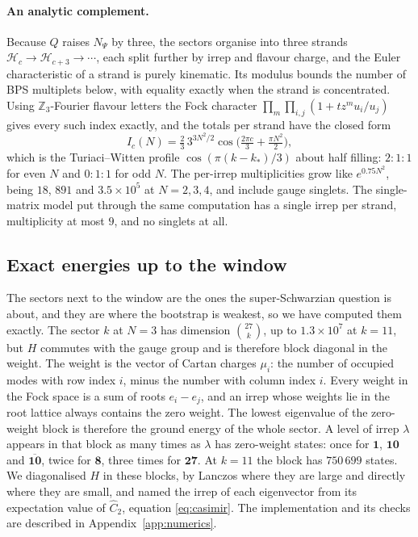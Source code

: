 \documentclass[10pt]{article}
\begin{document}
\paragraph{An analytic complement.} Because $Q$ raises $N_\Psi$ by three, the sectors organise into three
strands $\mathcal H_c\to\mathcal H_{c+3}\to\cdots$, each split further by irrep and flavour charge, and the
Euler characteristic of a strand is purely kinematic. Its modulus bounds the number of BPS multiplets below,
with equality exactly when the strand is concentrated. Using $\mathbb Z_3$-Fourier flavour letters the Fock
character $\prod_m\prod_{i,j}(1+tz^mu_i/u_j)$ gives every such index exactly, and the totals per strand have the
closed form
\begin{equation}
I_c(N)=\tfrac23\,3^{3N^2/2}\cos\!\Big(\tfrac{2\pi c}{3}+\tfrac{\pi N^2}{2}\Big),
\end{equation}
which is the Turiaci--Witten profile $\cos(\pi(k-k_*)/3)$ about half filling: $2{:}1{:}1$ for even $N$ and
$0{:}1{:}1$ for odd $N$. The per-irrep multiplicities grow like $e^{0.75N^2}$, being $18$, $891$ and
$3.5\times10^5$ at $N=2,3,4$, and include gauge singlets. The single-matrix model put through the same
computation has a single irrep per strand, multiplicity at most $9$, and no singlets at all.

\subsection{Exact energies up to the window}\label{sec:nearwindow}

The sectors next to the window are the ones the super-Schwarzian question is about, and they are where the
bootstrap is weakest, so we have computed them exactly. The sector $k$ at $N=3$ has dimension $\binom{27}k$, up
to $1.3\times10^7$ at $k=11$, but $H$ commutes with the gauge group and is therefore block diagonal in the weight.
The weight is the vector of Cartan charges $\mu_i$: the number of occupied modes with row index $i$, minus the
number with column index $i$. Every weight in the Fock space is a sum of roots $e_i-e_j$, and an irrep whose
weights lie in the root lattice always contains the zero weight. The lowest eigenvalue of the zero-weight block
is therefore the ground energy of the whole sector. A level of irrep $\lambda$ appears in that block as many
times as $\lambda$ has zero-weight states: once for $\mathbf 1$, $\mathbf{10}$ and $\overline{\mathbf{10}}$,
twice for $\mathbf 8$, three times for $\mathbf{27}$. At $k=11$ the block has $750\,699$ states. We
diagonalised $H$ in these blocks, by Lanczos where they are large and directly where they are small, and named the irrep of each eigenvector from its expectation value
of $\hat C_2$, equation \eqref{eq:casimir}. The implementation and its checks are described in
Appendix~\ref{app:numerics}.
\end{document}
